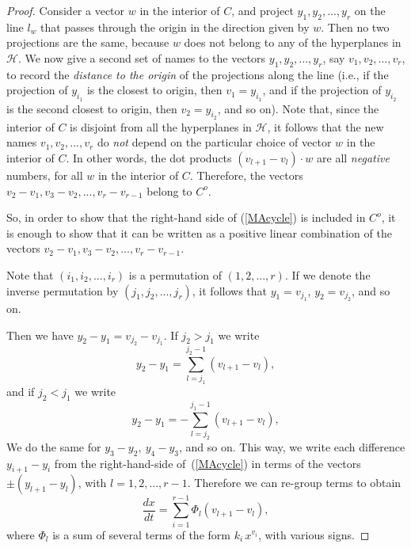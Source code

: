 \documentclass[12pt,letterpaper]{article}
\renewcommand{\H}{\mathcal{H}}
\begin{document}
\begin{proof}
Consider a vector $w$ in the interior of $C$, and project $y_1, y_2 ,..., y_r$ on the line $l_w$ that passes through the origin in the direction given by $w$. Then no two projections are the same, because $w$ does not belong to any of the hyperplanes in $\H$. 
%
We now give a second set of names to the vectors $y_1, y_2 ,..., y_r$, say $v_1, v_2 ,..., v_r$, to record the {\em distance to the origin} of the projections along the line (i.e., if the projection of $y_{i_1}$ is the closest to origin, then $v_1 = y_{i_1}$, and if the projection of $y_{i_2}$ is the second closest to origin, then $v_2 = y_{i_2}$,  and so on). Note that, since the interior of $C$ is disjoint from all the hyperplanes in $\H$, it follows that the new names $v_1, v_2 ,..., v_r$ do {\em not} depend on the particular choice of vector $w$ in the interior of $C$. In other words, the dot products 
$
(v_{l+1}-v_l) \cdot w
$
are all {\em negative} numbers, for all $w$ in the interior of $C$.
%
Therefore, the vectors $v_2-v_1, v_3-v_2, ..., v_r-v_{r-1}$ belong to $C^o$. 

So, in order to show that the right-hand side of (\ref{MAcycle}) is included in $C^o$, it is enough to show that it can be written as a positive linear combination of the vectors $v_2-v_1, v_3-v_2, ..., v_r-v_{r-1}$. 

Note that $(i_1,i_2,...,i_r)$ is a permutation of $(1,2,...,r)$. If we denote the inverse permutation by $(j_1,j_2,...,j_r)$, it follows that $y_1 = v_{j_1}$, $y_2 = v_{j_2}$, and so on.

Then we have $y_2 - y_1 = v_{j_2} - v_{j_1}$. If $j_2 > j_1$ we write
$$
y_2 - y_1 = \sum_{l=j_1}^{j_2-1} (v_{l+1} - v_l),
$$
and if $j_2 < j_1$ we write 
$$
y_2 - y_1 = -\sum_{l=j_2}^{j_1-1} (v_{l+1} - v_l),
$$
We do the same for $y_3 - y_2, \ y_4 - y_3$, and so on. 
This way, we write each difference $y_{i+1} - y_i$ from the right-hand-side of~(\ref{MAcycle}) in terms of the vectors $\pm(y_{l+1} - y_l)$, with $l=1,2, ...,r-1$. 
Therefore we can re-group terms to obtain
\begin{equation}\label{MAcycle_new}
\frac{dx}{dt} = \sum_{i=1}^{r-1} \Phi_l (v_{l+1} - v_l), 
\end{equation}
where $\Phi_l$ is a sum of several terms of the form $k_i \, x^{v_i}$, with various signs. 


\end{proof}
\end{document}
